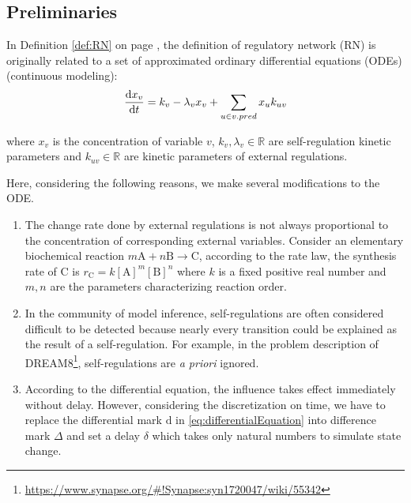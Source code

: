 \subsection{Preliminaries}
In Definition \ref{def:RN} on page \pageref{def:RN}, the definition of regulatory network (RN) is originally related to a set of approximated ordinary differential equations (ODEs) \cite{khalis2009smbionet} (continuous modeling):
\begin{equation}\label{eq:differentialEquation}
    \dfrac{{\rm d}x_v}{{\rm d}t}=k_v-\lambda_v x_v +\sum_{u\in v.pred}{x_uk_{uv}}
\end{equation}

where $x_v$ is the concentration of variable $v$, $k_v, \lambda_v\in \mathbb{R}$ are self-regulation kinetic parameters and $k_{uv}\in \mathbb{R}$ are kinetic parameters of external regulations.


Here, considering the following reasons, we make several modifications to the ODE.
\begin{enumerate}
    \item The change rate done by external regulations is not always proportional to the concentration of corresponding external variables. 
    Consider an elementary biochemical reaction $m\mathrm{A}+n\mathrm{B}\rightarrow \mathrm  {C}$, according to the rate law, the synthesis rate of C is $r_{\mathrm{C}}=k[{\mathrm{A}}]^{m}[{\mathrm{B}}]^{n}$ where $k$ is a fixed positive real number and $m,n$ are the parameters characterizing reaction order.
    \item In the community of model inference, self-regulations are often considered difficult to be detected because nearly every transition could be explained as the result of a self-regulation.
    For example, in the problem description of DREAM8\footnote{\url{https://www.synapse.org/\#!Synapse:syn1720047/wiki/55342}}, self-regulations are \textit{a priori} ignored.  
    \item According to the differential equation, the influence takes effect immediately without delay.
    However, considering the discretization on time, we have to replace the differential mark $\mathrm{d}$ in \ref{eq:differentialEquation} into difference mark $\Delta$ and set a delay $\delta$ which takes only natural numbers to simulate state change.
\end{enumerate}

